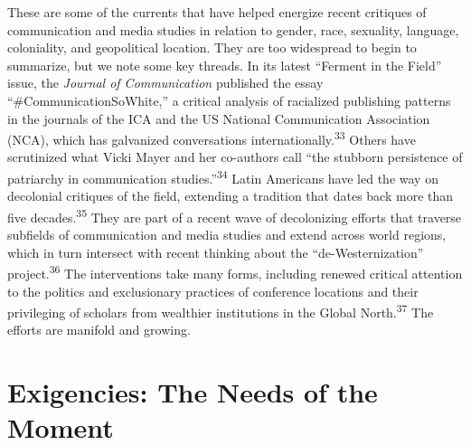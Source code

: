 \documentclass{tufte-handout}
\begin{document}
These are some of the currents that have helped energize recent
critiques of communication and media studies in relation to gender,
race, sexuality, language, coloniality, and geopolitical location. They
are too widespread to begin to summarize, but we note some key threads.
In its latest ``Ferment in the Field'' issue, the \emph{Journal of
Communication} published the essay ``\#CommunicationSoWhite,'' a
critical analysis of racialized publishing patterns in the journals of
the ICA and the US National Communication Association (NCA), which has
galvanized conversations internationally.\textsuperscript{33} Others
have scrutinized what Vicki Mayer and her co-authors call ``the stubborn
persistence of patriarchy in communication studies.''\textsuperscript{34} Latin Americans have led the way on
decolonial critiques of the field, extending a tradition that dates back
more than five decades.\textsuperscript{35} They are
part of a recent wave of decolonizing efforts that traverse subfields of
communication and media studies and extend across world regions, which
in turn intersect with recent thinking about the ``de-Westernization''
project.\textsuperscript{36} The interventions take many forms, including
renewed critical attention to the politics and exclusionary practices of
conference locations and their privileging of scholars from wealthier
institutions in the Global North.\textsuperscript{37}
The efforts are manifold and growing.

\hypertarget{exigencies-the-needs-of-the-moment}{%
\section{Exigencies: The Needs of the
Moment}\label{exigencies-the-needs-of-the-moment}}
\end{document}
